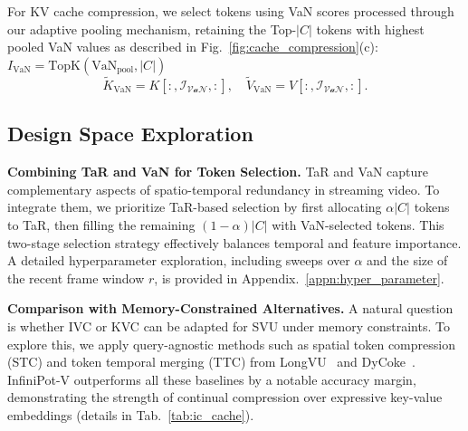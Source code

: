 For KV cache compression, we select tokens using VaN scores processed through our adaptive pooling mechanism, retaining the Top-$|C|$ tokens with highest pooled VaN values as described in Fig.~\ref{fig:cache_compression}(c): $I_\text{{VaN}} = \text{TopK}(\text{VaN}_{\text{pool}}, |C|)$
\begin{equation}
\tilde{K}_{\text{VaN}} = K[:, \mathcal{I_\text{{VaN}}}, :], \quad \tilde{V}_{\text{VaN}} = V[:, \mathcal{I_\text{{VaN}}}, :].
\end{equation}






\subsection{Design Space Exploration}
\label{subsec:combine}

\textbf{Combining TaR and VaN for Token Selection.}
TaR and VaN capture complementary aspects of spatio-temporal redundancy in streaming video. To integrate them, we prioritize TaR-based selection by first allocating $\alpha |C|$ tokens to TaR, then filling the remaining $(1 - \alpha)|C|$ with VaN-selected tokens. This two-stage selection strategy effectively balances temporal and feature importance. A detailed hyperparameter exploration, including sweeps over $\alpha$ and the size of the recent frame window $r$, is provided in Appendix.~\ref{appn:hyper_parameter}.


\textbf{Comparison with Memory-Constrained Alternatives.}
A natural question is whether IVC or KVC can be adapted for SVU under memory constraints. To explore this, we apply query-agnostic methods such as spatial token compression (STC) and token temporal merging (TTC) from LongVU~\cite{shen2024longvu} and DyCoke~\cite{tao2024dycokedynamiccompressiontokens}. InfiniPot-V outperforms all these baselines by a notable accuracy margin, demonstrating the strength of continual compression over expressive key-value embeddings (details in Tab.~\ref{tab:ic_cache}). 
